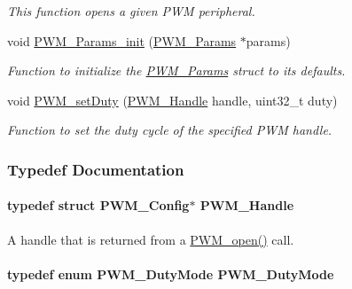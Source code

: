 \begin{DoxyCompactItemize}
\begin{DoxyCompactList}\small\item\em This function opens a given P\-W\-M peripheral. \end{DoxyCompactList}\item 
void \hyperlink{_p_w_m_8h_acbdd3192f9f06bf689e4a3855926dcac}{P\-W\-M\-\_\-\-Params\-\_\-init} (\hyperlink{struct_p_w_m___params}{P\-W\-M\-\_\-\-Params} $\ast$params)
\begin{DoxyCompactList}\small\item\em Function to initialize the \hyperlink{struct_p_w_m___params}{P\-W\-M\-\_\-\-Params} struct to its defaults. \end{DoxyCompactList}\item 
void \hyperlink{_p_w_m_8h_a9b4c4b744af933d4f2678dc18b49bfb4}{P\-W\-M\-\_\-set\-Duty} (\hyperlink{_p_w_m_8h_afdefc765f42bbad4dca246fda6e1354b}{P\-W\-M\-\_\-\-Handle} handle, uint32\-\_\-t duty)
\begin{DoxyCompactList}\small\item\em Function to set the duty cycle of the specified P\-W\-M handle. \end{DoxyCompactList}\end{DoxyCompactItemize}


\subsubsection{Typedef Documentation}
\paragraph[{P\-W\-M\-\_\-\-Handle}]{\setlength{\rightskip}{0pt plus 5cm}typedef struct {\bf P\-W\-M\-\_\-\-Config}$\ast$ {\bf P\-W\-M\-\_\-\-Handle}}\label{_p_w_m_8h_afdefc765f42bbad4dca246fda6e1354b}


A handle that is returned from a \hyperlink{_p_w_m_8h_ac963beab0c5c6901bf852f175028aeaf}{P\-W\-M\-\_\-open()} call. 

\paragraph[{P\-W\-M\-\_\-\-Duty\-Mode}]{\setlength{\rightskip}{0pt plus 5cm}typedef enum {\bf P\-W\-M\-\_\-\-Duty\-Mode}  {\bf P\-W\-M\-\_\-\-Duty\-Mode}}\label{_p_w_m_8h_a19cd06b0c3560cfdf4125d1bc70a155e}


